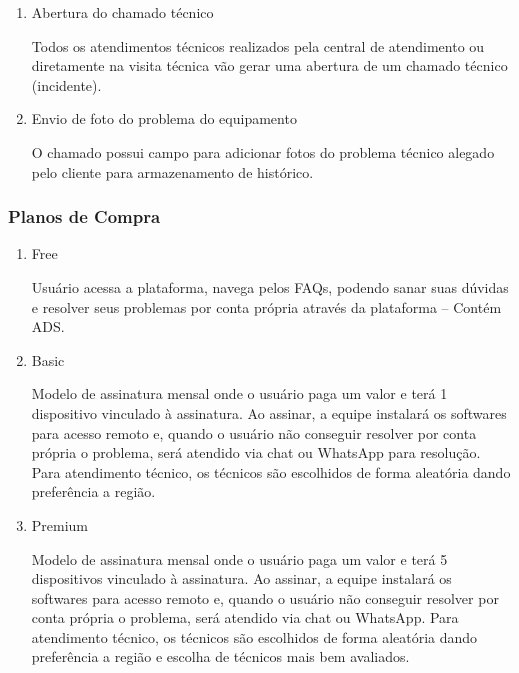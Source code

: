 \documentclass[
    12pt,               %
    openright,          %
    oneside,
    a4paper,            %
    MODELO,             %
    english,            %
    brazil              %
   ]{ifsp-spo-inf-ctds}
\begin{document}
	\begin{enumerate}
		
		\item Abertura do chamado técnico
		
		Todos os atendimentos técnicos realizados pela central de atendimento ou diretamente na visita técnica vão gerar uma abertura de um chamado técnico (incidente).
		
		\item Envio de foto do problema do equipamento
		
		O chamado possui campo para adicionar fotos do problema técnico alegado pelo cliente para armazenamento de histórico.
		
	\end{enumerate}

\subsubsection{Planos de Compra}

	\begin{enumerate}
		
		\item Free
		
		Usuário acessa a plataforma, navega pelos FAQs, podendo sanar suas dúvidas e resolver seus problemas por conta própria através da plataforma – Contém ADS.
		
		\item Basic
		
		Modelo de assinatura mensal onde o usuário paga um valor e terá 1 dispositivo vinculado à assinatura. Ao assinar, a equipe instalará os softwares para acesso remoto e, quando o usuário não conseguir resolver por conta própria o problema, será atendido via chat ou WhatsApp para resolução. Para atendimento técnico, os técnicos são escolhidos de forma aleatória dando preferência a região.
		
		\item Premium
		
		Modelo de assinatura mensal onde o usuário paga um valor e terá 5 dispositivos vinculado à assinatura. Ao assinar, a equipe instalará os softwares para acesso remoto e, quando o usuário não conseguir resolver por conta própria o problema, será atendido via chat ou WhatsApp. Para atendimento técnico, os técnicos são escolhidos de forma aleatória dando preferência a região e escolha de técnicos mais bem avaliados.
		
	\end{enumerate}
\end{document}
